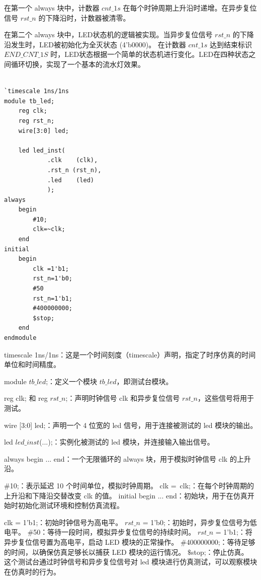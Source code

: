 \documentclass[12pt]{article}
\begin{document}
在第一个 always 块中，计数器 $cnt\_1s$ 在每个时钟周期上升沿时递增。在异步复位信号 $rst\_n$ 的下降沿时，计数器被清零。

在第二个 always 块中，LED状态机的逻辑被实现。当异步复位信号 $rst\_n$ 的下降沿发生时，LED被初始化为全灭状态 (4'b0000)。
在计数器 $cnt\_1s$ 达到结束标识 $END\_CNT\_1S$ 时，LED状态根据一个简单的状态机进行变化。LED在四种状态之间循环切换，实现了一个基本的流水灯效果。
\begin{lstlisting}

`timescale 1ns/1ns
module tb_led;
	reg	clk;
	reg	rst_n;
	wire[3:0] led;
	
	led led_inst(
			.clk	(clk),
			.rst_n (rst_n),
			.led	(led)
			);
always
	begin
		#10;
		clk=~clk;
	end
initial
	begin
		clk	=1'b1;
		rst_n=1'b0;
		#50
		rst_n=1'b1;
		#400000000;
		$stop;
	end
endmodule
\end{lstlisting}
timescale 1ns/1ns：这是一个时间刻度（timescale）声明，指定了时序仿真的时间单位和时间精度。

module $tb\_led$;：定义一个模块 $tb\_led$，即测试台模块。

reg clk; 和 reg $rst\_n$;：声明时钟信号 clk 和异步复位信号 $rst\_n$，这些信号将用于测试。

wire [3:0] led;：声明一个 4 位宽的 led 信号，用于连接被测试的 led 模块的输出。

led $led\_inst$(...);：实例化被测试的 led 模块，并连接输入输出信号。

always begin ... end：一个无限循环的 always 块，用于模拟时钟信号 clk 的上升沿。

$\#$10;：表示延迟 10 个时间单位，模拟时钟周期。
clk =~clk;：在每个时钟周期的上升沿和下降沿交替改变 clk 的值。
initial begin ... end：初始块，用于在仿真开始时初始化测试环境和控制仿真流程。

clk = 1'b1;：初始时钟信号为高电平。
$rst\_n$ = 1'b0;：初始时，异步复位信号为低电平。
$\#$50：等待一段时间，模拟异步复位信号的持续时间。
$rst\_n$ = 1'b1;：将异步复位信号置为高电平，启动 LED 模块的正常操作。
$\#$400000000;：等待足够的时间，以确保仿真足够长以捕获 LED 模块的运行情况。
$\$$stop;：停止仿真。
这个测试台通过时钟信号和异步复位信号对 led 模块进行仿真测试，可以观察模块在仿真时的行为。
\end{document}
